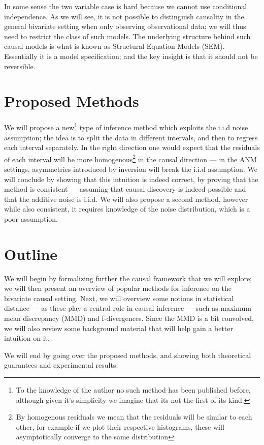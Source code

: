 In some sense the two variable case is hard because we cannot use conditional independence. As we will see, 
it is not possible to distinguish causality in the general bivariate setting when only observing 
observational data; we will thus need to restrict 
the class of such models. The underlying structure behind such causal models is what is known as 
Structural Equation Models (SEM). Essentially 
it is a model specification; and the key insight is that it should not be reversible. 


\section{Proposed Methods}

We will propose a new\footnote{To the knowledge of the author no such method has been published 
before, although given it's simplicity we imagine that its not the first of its kind.} type of inference method which exploits the i.i.d 
noise assumption; the idea is to split the data in different intervals, and then to regress each 
interval separately. In the right direction one would expect that the residuals of each 
interval will be more homogenous\footnote{By homogenous residuals we mean that the residuals will be similar 
to each other, for example if we plot their respective histograms, these will asymptotically converge to the 
same distribution} in the causal direction --- in the ANM settings, asymmetries introduced
by inversion will break the i.i.d assumption. We will conclude by 
showing that this intuition is indeed correct, by proving that the method is consistent --- 
assuming that causal discovery is indeed possible and that the additive noise is i.i.d. We will
also propose a second method, however while also consistent, it requires knowledge of the 
noise distribution, which is a poor assumption. 


\section{Outline}

We will begin by formalizing further the causal framework that we will explore; we will then present an overview of 
popular methods for inference on the bivariate causal setting. Next, we will overview some notions in statistical distance 
--- as these play a central role in causal inference --- such as maximum mean discrepancy (MMD) and f-divergences. 
Since the MMD is a bit convolved, we will also review some background material that will help gain a better intuition on it. 

We will end by going over the proposed methods, and showing both theoretical guarantees and experimental results. 




